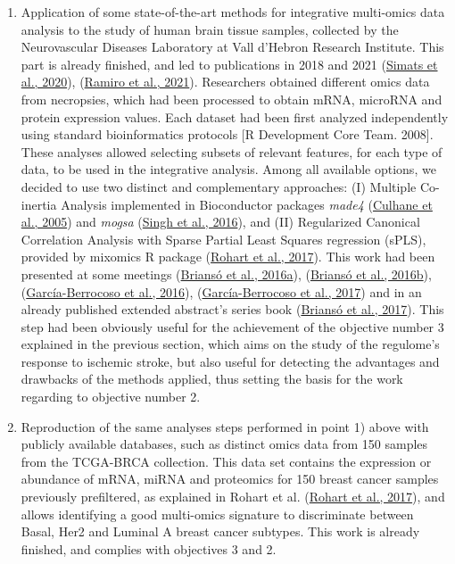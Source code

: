 \documentclass[a4paper, nobind]{templates/ociamthesis}
\begin{document}
\begin{enumerate}
\def\labelenumi{\arabic{enumi}.}
\item
  Application of some state-of-the-art methods for integrative multi-omics data analysis to the study of human brain tissue samples, collected by the Neurovascular Diseases Laboratory at Vall d'Hebron Research Institute. This part is already finished, and led to publications in 2018 and 2021 (\protect\hyperlink{ref-simats_mouse_2020}{Simats et al., 2020}), (\protect\hyperlink{ref-ramiro_integrative_2021}{Ramiro et al., 2021}). Researchers obtained different omics data from necropsies, which had been processed to obtain mRNA, microRNA and protein expression values. Each dataset had been first analyzed independently using standard bioinformatics protocols {[}R Development Core Team. 2008{]}. These analyses allowed selecting subsets of relevant features, for each type of data, to be used in the integrative analysis. Among all available options, we decided to use two distinct and complementary approaches: (I) Multiple Co-inertia Analysis implemented in Bioconductor packages \emph{made4} (\protect\hyperlink{ref-culhane_made4_2005}{Culhane et al., 2005}) and \emph{mogsa} (\protect\hyperlink{ref-singh_diablo_2016}{Singh et al., 2016}), and (II) Regularized Canonical Correlation Analysis with Sparse Partial Least Squares regression (sPLS), provided by mixomics R package (\protect\hyperlink{ref-rohart_mixomics_2017}{Rohart et al., 2017}). This work had been presented at some meetings (\protect\hyperlink{ref-brianso_ibc_2016}{Briansó et al., 2016a}), (\protect\hyperlink{ref-brianso_eccb_2016}{Briansó et al., 2016b}), (\protect\hyperlink{ref-garcia-berrocoso_scb_2016}{García-Berrocoso et al., 2016}), (\protect\hyperlink{ref-garcia-berrocoso_scbf_2017}{García-Berrocoso et al., 2017}) and in an already published extended abstract's series book (\protect\hyperlink{ref-brianso_integrative_2017}{Briansó et al., 2017}). This step had been obviously useful for the achievement of the objective number 3 explained in the previous section, which aims on the study of the regulome's response to ischemic stroke, but also useful for detecting the advantages and drawbacks of the methods applied, thus setting the basis for the work regarding to objective number 2.
\item
  Reproduction of the same analyses steps performed in point 1) above with publicly available databases, such as distinct omics data from 150 samples from the TCGA-BRCA collection. This data set contains the expression or abundance of mRNA, miRNA and proteomics for 150 breast cancer samples previously prefiltered, as explained in Rohart et al. (\protect\hyperlink{ref-rohart_mixomics_2017}{Rohart et al., 2017}), and allows identifying a good multi-omics signature to discriminate between Basal, Her2 and Luminal A breast cancer subtypes. This work is already finished, and complies with objectives 3 and 2.

\end{enumerate}
\end{document}
